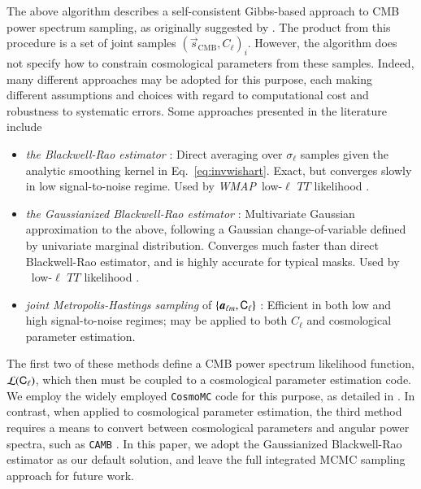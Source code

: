 \documentclass[twocolumn]{aa}
\def\WMAP{\emph{WMAP}}
\newcommand{\s}[0]{\vec{s}}
\renewcommand{\a}[0]{\vec{a}}
\renewcommand{\C}[0]{\tens{C}}
\newcommand{\BP}{\textsc{BeyondPlanck}}
\begin{document}
The above algorithm describes a self-consistent Gibbs-based approach to CMB
power spectrum sampling, as originally suggested by
\citet{wandelt2004}. The product from this procedure is a set of joint
samples $(\s_{\mathrm{CMB}}, C_{\ell})_i$. However, the algorithm does
not specify how to constrain cosmological parameters from these
samples. Indeed, many different approaches may be adopted for this
purpose, each making different assumptions and choices with regard to
computational cost and robustness to systematic errors. Some
approaches presented in the literature include
\begin{itemize}
\item \emph{the Blackwell-Rao estimator} \citep{chu2005}: Direct
  averaging over $\sigma_{\ell}$ samples given the analytic smoothing
  kernel in Eq.~\eqref{eq:invwishart}. Exact, but converges slowly in
  low signal-to-noise regime. Used by \WMAP\ low-$\ell$ $TT$
  likelihood \citep{hinshaw2012}.
\item \emph{the Gaussianized Blackwell-Rao estimator}
  \citep{rudjord:2009}: Multivariate Gaussian approximation to the
  above, following a Gaussian change-of-variable defined by univariate
  marginal distribution. Converges much faster than direct
  Blackwell-Rao estimator, and is highly accurate for typical
  masks. Used by \Planck\ low-$\ell$ $TT$ likelihood
  \citep[e.g.,][]{planck2016-l05}.
\item \emph{joint Metropolis-Hastings sampling} of $\{\a_{\ell m},
  \C_{\ell}\}$ \citep{jewell:2009,racine:2016}: Efficient in both low
  and high signal-to-noise regimes; may be applied to both $C_{\ell}$
  and cosmological parameter estimation. %
\end{itemize}
The first two of these methods define a CMB power spectrum likelihood
function, $\mathcal{L}(\C_{\ell})$, which then must be coupled to a
cosmological parameter estimation code. We employ the widely employed
\texttt{CosmoMC} \citep{cosmomc} code for this purpose, as detailed in
\citet{bp12}. In contrast, when applied to cosmological parameter
estimation, the third method requires a means to convert between
cosmological parameters and angular power spectra, such as \texttt{CAMB}
\citep{Lewis:1999bs}. In this paper, we adopt the
Gaussianized Blackwell-Rao estimator as our default solution, and
leave the full integrated MCMC sampling approach for future work.
\end{document}
